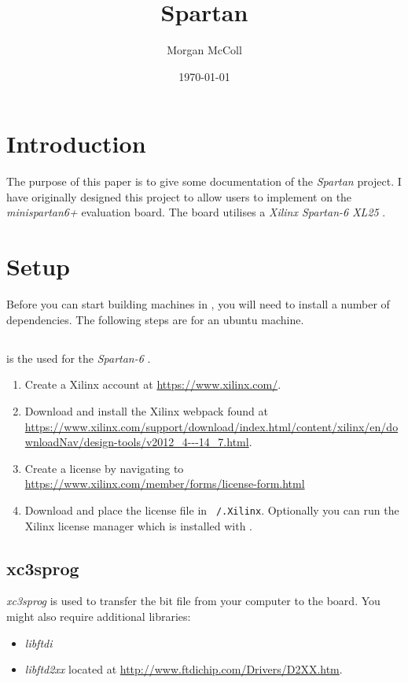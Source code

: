 \documentclass{article}
\begin{document}
    \title{Spartan \LLFSM}
    \date{\today}
    \author{Morgan McColl}
    \maketitle
    \tableofcontents
    \newpage
    \section{Introduction}
        The purpose of this paper is to give some documentation of the \textit{Spartan \LLFSM} project. I have originally designed this project to allow users to implement \LLFSMs\/ on the \textit{minispartan6+} evaluation board. The board utilises a \textit{Xilinx Spartan-6 XL25} \FPGA.
    \section{Setup}
        Before you can start building machines in \VHDL, you will need to install a number of dependencies. The following steps are for an ubuntu machine.
        \subsection{\ISE}
            \ISE\/ is the \IDE\/ used for the \textit{Spartan-6} \FPGA.
            \begin{enumerate}
                \item Create a Xilinx account at \href{url}{https://www.xilinx.com/}.
                \item Download and install the Xilinx \ISE\/ webpack found at \href{URL}{\url{https://www.xilinx.com/support/download/index.html/content/xilinx/en/downloadNav/design-tools/v2012_4---14_7.html}}.
                \item Create a license by navigating to \href{URL}{\url{https://www.xilinx.com/member/forms/license-form.html}}
                \item Download and place the license file in \texttt{~/.Xilinx}. Optionally you can run the Xilinx license manager which is installed with \ISE.
            \end{enumerate}
            \subsection{xc3sprog}
                \textit{xc3sprog} is used to transfer the bit file from your computer to the board.
                You might also require additional libraries:
                \begin{itemize}
                    \item \textit{libftdi}
                    \item \textit{libftd2xx} located at \href{URL}{\url{http://www.ftdichip.com/Drivers/D2XX.htm}}.
                \end{itemize}
\end{document}
